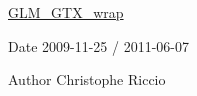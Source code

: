 \hyperlink{group__gtx__wrap}{G\-L\-M\-\_\-\-G\-T\-X\-\_\-wrap}

\begin{DoxyDate}{Date}
2009-\/11-\/25 / 2011-\/06-\/07 
\end{DoxyDate}
\begin{DoxyAuthor}{Author}
Christophe Riccio 
\end{DoxyAuthor}
